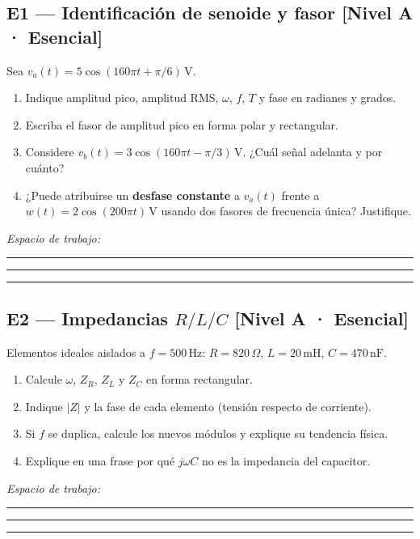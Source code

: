 \documentclass[11pt, a4paper]{article}
\begin{document}
\subsection*{E1 — Identificación de senoide y fasor \hfill \textnormal{\small [Nivel A · Esencial]}}
Sea $v_a(t) = 5\cos(160\pi t + \pi/6)\,\text{V}$.
\begin{enumerate}\setlength\itemsep{0.15cm}
    \item[(a)] Indique amplitud pico, amplitud RMS, $\omega$, $f$, $T$ y fase en radianes y grados.
    \item[(b)] Escriba el fasor de amplitud pico en forma polar y rectangular.
    \item[(c)] Considere $v_b(t) = 3\cos(160\pi t - \pi/3)\,\text{V}$. ¿Cuál señal adelanta y por cuánto?
    \item[(d)] ¿Puede atribuirse un \textbf{desfase constante} a $v_a(t)$ frente a $w(t) = 2\cos(200\pi t)\,\text{V}$ usando dos fasores de frecuencia única? Justifique.
\end{enumerate}
\noindent\textit{Espacio de trabajo:}\par\vspace{0.35cm}
\noindent\rule{\textwidth}{0.3pt}\par\vspace{0.45cm}
\noindent\rule{\textwidth}{0.3pt}\par\vspace{0.45cm}
\noindent\rule{\textwidth}{0.3pt}

\subsection*{E2 — Impedancias $R/L/C$ \hfill \textnormal{\small [Nivel A · Esencial]}}
Elementos ideales aislados a $f = 500\,\text{Hz}$: $R = 820\,\Omega$, $L = 20\,\text{mH}$, $C = 470\,\text{nF}$.
\begin{enumerate}\setlength\itemsep{0.15cm}
    \item[(a)] Calcule $\omega$, $Z_R$, $Z_L$ y $Z_C$ en forma rectangular.
    \item[(b)] Indique $|Z|$ y la fase de cada elemento (tensión respecto de corriente).
    \item[(c)] Si $f$ se duplica, calcule los nuevos módulos y explique su tendencia física.
    \item[(d)] Explique en una frase por qué $j\omega C$ no es la impedancia del capacitor.
\end{enumerate}
\noindent\textit{Espacio de trabajo:}\par\vspace{0.35cm}
\noindent\rule{\textwidth}{0.3pt}\par\vspace{0.45cm}
\noindent\rule{\textwidth}{0.3pt}\par\vspace{0.45cm}
\noindent\rule{\textwidth}{0.3pt}
\end{document}
